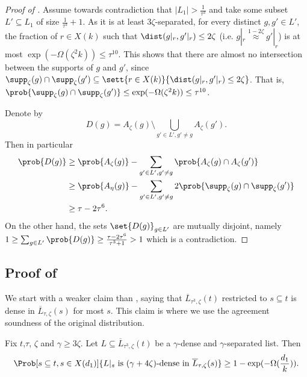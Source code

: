 \begin{proof}[Proof of ]
    Assume towards contradiction that \(|L_1|>\frac{1}{\tau^3}\) and take some subset \(L'\subseteq L_1\) of size \(\frac{1}{\tau^3}+1\). As it is at least \(3\zeta\)-separated, for every distinct \(g,g' \in L'\), the fraction of \(r \in X(k)\) such that \(\dist(g|_r,g'|_r) \leq 2\zeta\) (i.e. \(g|_r \overset{1-2\zeta}{\approx} g'|_r\)) is at most \(\exp(-\Omega(\zeta^2 k))\leq \tau^{10}\). This shows that there are almost no intersection between the supports of \(g\) and \(g'\), since \(\supp_\zeta (g) \cap \supp_{\zeta}(g') \subseteq \sett{r \in X(k)}{\dist(g|_r,g'|_r) \leq 2\zeta}\). That is, \(\prob{\supp_\zeta (g) \cap \supp_{\zeta}(g')} \leq \exp(-\Omega(\zeta^2 k))\leq \tau^{10}\).
    
    Denote by 
    \[D(g) = A_{\zeta}(g) \setminus \bigcup_{g' \in L', g' \ne g}A_{\zeta}(g').\]
    Then in particular 
    \begin{align}
        \prob{D(g)} &\geq \prob{A_{\zeta}(g)} - \sum_{g' \in L', g' \ne g}\prob{A_\zeta (g) \cap A_\zeta (g')} \\
        &\geq \prob{A_{\eta}(g)} - \sum_{g' \in L', g' \ne g} 2 \prob{\supp_{\zeta}(g) \cap \supp_{\zeta}(g')} \\
        &\geq \tau - 2\tau^6.
    \end{align}
    On the other hand, the sets \(\set{D(g)}_{g \in L'}\) are mutually disjoint, namely
    \(1 \geq \sum_{g \in L'} \prob{D(g)} \geq \frac{\tau-2\tau^6}{\tau^3+1}>1\) which is a contradiction.
\end{proof}

\subsection{Proof of }
We start with a weaker claim than , saying that \(\overline{L}_{\tau^3,\zeta}(t)\) restricted to \(s \subseteq t\) is dense in \(\overline{L}_{\tau,\zeta}(s)\) for most \(s\). This claim is where we use the agreement soundness of the original distribution.

\begin{claim} \label{claim:density-of-smaller-tau}
    Fix \(t\),\(\tau\), \(\zeta\) and \(\gamma \geq 3\zeta\). Let \(L \subseteq \overline{L}_{\tau^3,\zeta}(t)\) be a \(\gamma\)-dense and \(\gamma\)-separated list. Then
    \begin{equation*}
        \Prob[s \subseteq t,s \in X(d_1)]{L|_s \text{ is \((\gamma+4\zeta)\)-dense in } \overline{L}_{\tau,\zeta}(s)} \geq 1-\exp(-\Omega(\frac{d_1}{k})).
    \end{equation*}
\end{claim}

